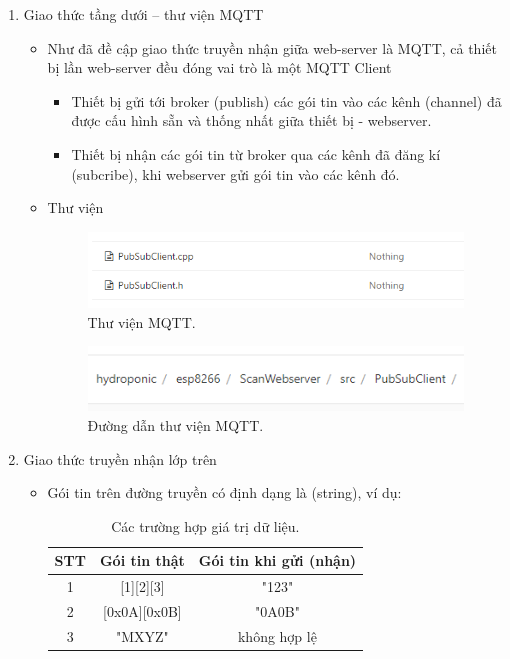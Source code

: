 \documentclass[a4paper,12pt,oneside]{article}
\begin{document}
\begin{enumerate}
\begin{enumerate}
		\item Giao thức tầng dưới – thư viện MQTT
		\begin{itemize}
		\item Như đã đề cập giao thức truyền nhận giữa web-server là MQTT, cả thiết bị lần web-server đều đóng vai trò là một MQTT Client
			\begin{itemize}
			\item Thiết bị gửi tới broker (publish) các gói tin vào các kênh (channel) đã được cấu hình sẵn và thống nhất giữa thiết bị - webserver.
			\item Thiết bị nhận các gói tin từ broker qua các kênh đã đăng kí (subcribe), khi webserver gửi gói tin vào các kênh đó.
			\end{itemize}
		\item Thư viện
			\begin{figure}[H]
			\centering
			\includegraphics[scale=.7]{hinh/lib_mqtt.PNG}
			\caption{Thư viện MQTT.}
			\end{figure}
			
			\begin{figure}[H]
			\centering
			\includegraphics[scale=.7]{hinh/path_mqtt.PNG}
			\caption{Đường dẫn thư viện MQTT.}
			\end{figure}
		
		\end{itemize}
		\item Giao thức truyền nhận lớp trên
		\begin{itemize}
		\item Gói tin trên đường truyền có định dạng là (string), ví dụ:
		
		\begin{table}[!htp]
    	\centering
		\begin{tabular}{|c|c|c|}
		\hline 
		STT & Gói tin thật & Gói tin khi gửi (nhận) \\ 
		\hline 
		1 & [1][2][3] & "123" \\ 
		\hline 
		2 & [0x0A][0x0B] & "0A0B" \\ 
		\hline 
		3 & "MXYZ" & không hợp lệ \\ 
		\hline 
		\end{tabular} 
    	\caption{Các trường hợp giá trị dữ liệu.}
		\end{table}
		

\end{itemize}
\end{enumerate}
\end{enumerate}
\end{document}
